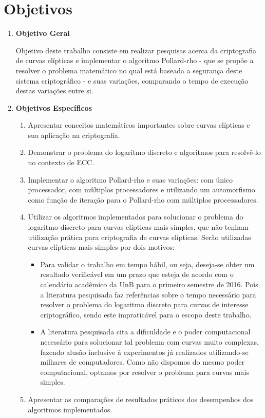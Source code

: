 \section*{Objetivos}
\begin{enumerate}
	\item \textbf{Objetivo Geral}

Objetivo deste trabalho consiste em realizar pesquisas acerca da criptografia de curvas elípticas e implementar o algoritmo Pollard-rho - que se propõe a resolver o problema matemático no qual está baseada a segurança deste sistema criptográfico - e suas variações, comparando o tempo de execução destas variações entre si.

	\item \textbf{Objetivos Específicos}
	\begin{enumerate}
		\item Apresentar conceitos matemáticos importantes sobre curvas elípticas e sua aplicação na criptografia.
		\item Demonstrar o problema do logaritmo discreto e algoritmos para resolvê-lo no contexto de ECC.
		\item Implementar o algoritmo Pollard-rho e suas variações: com único processador, com múltiplos processadores e utilizando um automorfismo como função de iteração para o Pollard-rho com múltiplos processadores.
		\item Utilizar os algoritmos implementados para solucionar o problema do logaritmo discreto para curvas elípticas mais simples, que não tenham utilização prática para criptografia de curvas elípticas. Serão utilizadas curvas elípticas mais simples por dois motivos:
		\begin{itemize}
			\item Para validar o trabalho em tempo hábil, ou seja, deseja-se obter um resultado verificável em um prazo que esteja de acordo com o calendário acadêmico da UnB para o primeiro semestre de 2016. Pois a literatura pesquisada faz referências sobre o tempo necessário para resolver o problema do logaritmo discreto para curvas de interesse criptográfico, sendo este impraticável para o escopo deste trabalho.
			\item A literatura pesquisada cita a dificuldade e o poder computacional necessário para solucionar tal problema com curvas muito complexas, fazendo alusão inclusive à experimentos já realizados utilizando-se milhares de computadores. Como não dispomos do mesmo poder computacional, optamos por resolver o problema para curvas mais simples.
		\end{itemize}
		\item Apresentar as comparações de resultados práticos dos desempenhos dos algoritmos implementados.
	\end{enumerate}
\end{enumerate}

